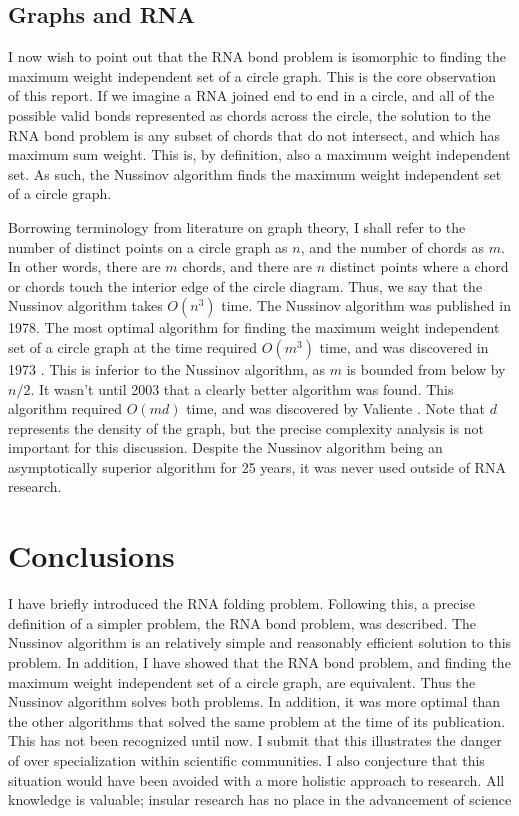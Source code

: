 \documentclass[12pt, a4paper]{article}
\begin{document}
\subsection{Graphs and RNA}
I now wish to point out that the RNA bond problem is isomorphic to finding the maximum weight independent set of a circle graph. This is the core observation of this report. If we imagine a RNA joined end to end in a circle, and all of the possible valid bonds represented as chords across the circle, the solution to the RNA bond problem is any subset of chords that do not intersect, and which has maximum sum weight. This is, by definition, also a maximum weight independent set. As such, the Nussinov algorithm finds the maximum weight independent set of a circle graph.

Borrowing terminology from literature on graph theory, I shall refer to the number of distinct points on a circle graph as $n$, and the number of chords as $m$. In other words, there are $m$ chords, and there are $n$ distinct points where a chord or chords touch the interior edge of the circle diagram. Thus, we say that the Nussinov algorithm takes $O(n^3)$ time. The Nussinov algorithm was published in 1978. The most optimal algorithm for finding the maximum weight independent set of a circle graph at the time required $O(m^3)$ time, and was discovered in 1973 \cite{gavril1973algorithms}. This is inferior to the Nussinov algorithm, as $m$ is bounded from below by $n / 2$. It wasn't until 2003 that a clearly better algorithm was found. This algorithm required $O(md)$ time, and was discovered by Valiente \cite{valiente2003new}. Note that $d$ represents the density of the graph, but the precise complexity analysis is not important for this discussion. Despite the Nussinov algorithm being an asymptotically superior algorithm for 25 years, it was never used outside of RNA research.


\section{Conclusions}
I have briefly introduced the RNA folding problem. Following this, a precise definition of a simpler problem, the RNA bond problem, was described. The Nussinov algorithm is an relatively simple and reasonably efficient solution to this problem. In addition, I have showed that the RNA bond problem, and finding the maximum weight independent set of a circle graph, are equivalent. Thus the Nussinov algorithm solves both problems. In addition, it was more optimal than the other algorithms that solved the same problem at the time of its publication. This has not been recognized until now. I submit that this illustrates the danger of over specialization within scientific communities. I also conjecture that this situation would have been avoided with a more holistic approach to research. All
knowledge is valuable; insular research has no place in the advancement of science




\end{document}
